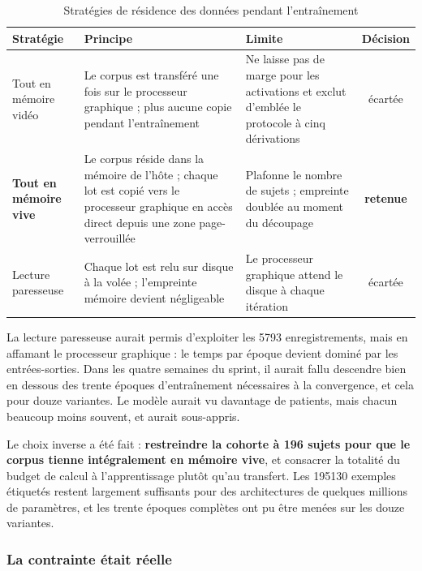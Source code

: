 \begin{table}[H]
\centering

\small
\begin{tabular}{@{}L{2.9cm}L{4.5cm}L{4.3cm}c@{}}
\toprule
\textbf{Stratégie} & \textbf{Principe} & \textbf{Limite} & \textbf{Décision} \\
\midrule
Tout en mémoire vidéo &
Le corpus est transféré une fois sur le processeur graphique ; plus aucune copie
pendant l'entraînement &
Ne laisse pas de marge pour les activations et exclut d'emblée le protocole à cinq
dérivations & écartée \\
\addlinespace[3pt]
\textbf{Tout en mémoire vive} &
Le corpus réside dans la mémoire de l'hôte ; chaque lot est copié vers le processeur
graphique en accès direct depuis une zone page-verrouillée &
Plafonne le nombre de sujets ; empreinte doublée au moment du découpage &
\textbf{retenue} \\
\addlinespace[3pt]
Lecture paresseuse &
Chaque lot est relu sur disque à la volée ; l'empreinte mémoire devient négligeable &
Le processeur graphique attend le disque à chaque itération &
écartée \\
\bottomrule
\end{tabular}
\caption{Stratégies de résidence des données pendant l'entraînement}
\label{tab:residence}
\end{table}

La lecture paresseuse aurait permis d'exploiter les \num{5793} enregistrements, mais en
affamant le processeur graphique : le temps par époque devient dominé par les
entrées-sorties. Dans les quatre semaines du sprint, il aurait fallu descendre bien en
dessous des trente époques d'entraînement nécessaires à la convergence, et cela pour
douze variantes. Le modèle aurait vu davantage de patients, mais chacun beaucoup moins
souvent, et aurait sous-appris.

Le choix inverse a été fait : \textbf{restreindre la cohorte à 196 sujets pour que le
corpus tienne intégralement en mémoire vive}, et consacrer la totalité du budget de
calcul à l'apprentissage plutôt qu'au transfert. Les \num{195130} exemples étiquetés
restent largement suffisants pour des architectures de quelques millions de paramètres,
et les trente époques complètes ont pu être menées sur les douze variantes.

\subsubsection{La contrainte était réelle}

